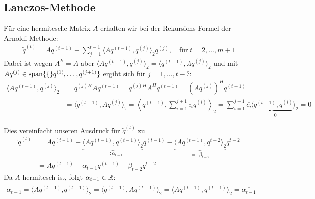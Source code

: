 \subsection{Lanczos-Methode}
Für eine hermitesche Matrix $A$ erhalten wir bei der Rekursions-Formel der Arnoldi-Methode:
%
\begin{align*}
  \tilde{q}^{(t)} 
  = Aq^{(t-1)} - \sum_{j=1}^{t-1} \langle Aq^{(t-1)}, q^{(j)}\rangle_2 q^{(j)},
  \quad \text{für } t=2,\dots,m+1
\end{align*}
%
Dabei ist wegen $A^H=A$ aber $\langle Aq^{(t-1)}, q^{(j)}\rangle_2 = \langle q^{(t-1)}, Aq^{(j)}\rangle_2$ und 
mit $Aq^{(j)}\in\text{span}\{\{\}q^{(1)},\dots,q^{(j+1)}\}$ ergibt sich für $j=1,\dots,t-3$:
%
\begin{align*}
  \langle Aq^{(t-1)}, q^{(j)}\rangle_2 
  &= q^{(j)H}Aq^{(t-1)}
  = q^{(j)H}A^Hq^{(t-1)}
  = (Aq^{(j)})^Hq^{(t-1)} \\
  &= \langle q^{(t-1)}, Aq^{(j)}\rangle_2 
  = \left\langle q^{(t-1)}, \sum_{i=1}^{j+1} c_i q^{(i)}\right\rangle _2 
  = \sum_{i=1}^{j+1} \overline{c_i} \underbrace{\langle q^{(t-1)}, q^{(i)}}_{=0}\rangle _2 
  = 0
\end{align*}

Dies vereinfacht unseren Ausdruck für $\tilde{q}^{(t)}$ zu
%
\begin{align*}
  \tilde{q}^{(t)} 
  &= Aq^{(t-1)} - \underbrace{\langle Aq^{(t-1)}, q^{(t-1)}\rangle_2}_{=:\alpha_{t-1}} q^{(t-1)}
  - \underbrace{\langle Aq^{(t-1)}, q^{t-2}\rangle_2}_{=:\beta_{t-2}} q^{t-2} \\
  &= Aq^{(t-1)}-\alpha_{t-1}q^{(t-1)}-\beta_{t-2}q^{t-2}
  \tag{1}\label{eq:lanczosEQ1}
\end{align*}
%
Da $A$ hermitesch ist, folgt $\alpha_{t-1}\in\mathbb R$:
%
\begin{align*}
  \alpha_{t-1}  
  = \langle Aq^{(t-1)}, q^{(t-1)}\rangle_2 
  = \langle q^{(t-1)}, Aq^{(t-1)}\rangle_2 
  = \overline{\langle Aq^{(t-1)}, q^{(t-1)}\rangle_2 }
  = \overline{\alpha_{t-1}}
\end{align*}
%

